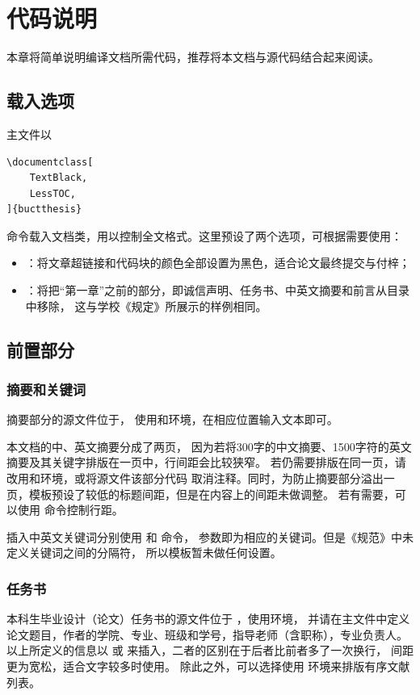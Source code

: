 \chapter{代码说明}\label{chap:CodeIntro}
本章将简单说明编译文档所需代码，推荐将本文档与源代码结合起来阅读。

\section{载入选项}\label{sec:loadsty}
主文件以
\begin{lstlisting}
\documentclass[
	TextBlack,
	LessTOC,
]{buctthesis}
\end{lstlisting}
命令载入文档类，用以控制全文格式。这里预设了两个选项，可根据需要使用：
\begin{itemize}
	\item {}：将文章超链接和代码块的颜色全部设置为黑色，适合论文最终提交与付梓；
	\item {}：将把“第一章”之前的部分，即诚信声明、任务书、中英文摘要和前言从目录中移除，
	这与学校《规定》所展示的样例相同。
\end{itemize}


\section{前置部分}\label{sec:frontmatter}
\subsection{摘要和关键词}\label{subsec:abstract}
摘要部分的源文件位于，
使用和环境，在相应位置输入文本即可。

本文档的中、英文摘要分成了两页，
因为若将300字的中文摘要、1500字符的英文摘要及其关键字排版在一页中，行间距会比较狭窄。
若仍需要排版在同一页，请改用和环境，或将源文件该部分代码
取消注释。同时，为防止摘要部分溢出一页，模板预设了较低的标题间距，但是在内容上的间距未做调整。
若有需要，可以使用  命令控制行距。

插入中英文关键词分别使用 和 命令，
参数即为相应的关键词。但是《规范》中未定义关键词之间的分隔符，
所以模板暂未做任何设置。

\subsection{任务书}\label{subsec:taskbook}
本科生毕业设计（论文）任务书的源文件位于 ，使用环境，
并请在主文件中定义论文题目，作者的学院、专业、班级和学号，指导老师（含职称），专业负责人。
以上所定义的信息以  或  来插入，二者的区别在于后者比前者多了一次换行，
间距更为宽松，适合文字较多时使用。
除此之外，可以选择使用  环境来排版有序文献列表。

